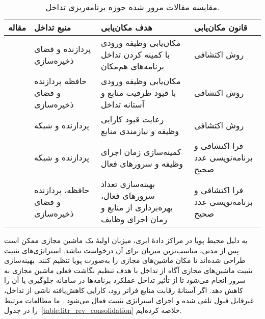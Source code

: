 \begin{table}[t]
\center
\caption{مقایسه مقالات مرور شده حوزه برنامه‌ریزی تداخل.}
\begin{tabular}{|c|p{3cm}|p{6cm}|p{4cm}|}
\hline
مقاله & منبع تداخل & هدف مکان‌یابی & قانون مکان‌یابی \\
\hline
\hline
\cite{Chiang2011TRACON} & پردازنده و فضای ذخیره‌سازی & مکان‌یابی وظیفه ورودی با کمینه کردن تداخل برنامه‌های هم‌مکان & روش اکتشافی \\
\cite{jersak2016performance} & حافظه پردازنده و فضای ذخیره‌سازی & مکان‌یابی وظیفه ورودی با قیود ظرفیت منابع و آستانه تداخل & روش اکتشافی \\
\cite{sampaio2015piasa} & پردازنده و شبکه & رعایت قیود کارایی وظیفه و نیازمندی منابع & روش اکتشافی \\
\cite{meloalves2018interference} & پردازنده و شبکه & کمینه‌سازی زمان اجرای وظیفه و سرورهای فعال & فرا اکتشافی و برنامه‌نویسی عدد صحیح \\
\cite{hamdi2019managing} & حافظه، پردازنده و فضای ذخیره‌سازی & بهینه‌سازی تعداد سرورهای فعال، بهره‌برداری از منابع و زمان اجرای وظایف & فرا اکتشافی و برنامه‌نویسی عدد صحیح \\
\hline
\end{tabular}
\label{table:litr_rev_schedule}
\end{table}

به دلیل محیط پویا در مراکز دادهٔ ابری، میزبان اولیهٔ یک ماشین مجازی ممکن است پس از مدتی، مناسب‌ترین میزبان برای آن درخواست نباشد. استراتژی‌های تثبیت طراحی شده‌اند تا مکان ماشین‌های مجازی را به‌صورت پویا تنظیم کنند. بهینه‌سازی تثبیت ماشین‌های مجازی آگاه از تداخل با هدف تنظیم نگاشت فعلی ماشین مجازی به سرور انجام می‌شود تا از تأثیر تداخل عملکرد برنامه‌ها در سامانه جلوگیری یا آن را کاهش دهد. اگر آستانهٔ رقابت منابع فراتر رود، کارایی کاهش‌یافته ناشی از تداخل، غیرقابل قبول تلقی شده و اجرای استراتژی تثبیت فعال می‌شود \cite{Zhang2013CPI2, zhu2012performance}. ما مطالعات مرتبط را در جدول~\ref{table:litr_rev_consolidation} خلاصه کرده‌ایم.

